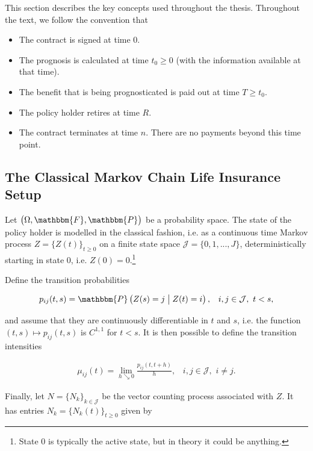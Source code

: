 \documentclass{article}
\newcommand{\1}[1]{\mathbbm{1}_{\left\lbrace #1 \right\rbrace}}
\theoremstyle{break}
\theoremstyle{remark}
\numberwithin{equation}{section}
\begin{document}
This section describes the key concepts used throughout the thesis. Throughout the text, we follow the convention that 

\begin{itemize}
	\item The contract is signed at time $0$.
	\item The prognosis is calculated at time $t_0 \geq 0$ (with the information available at that time).
	\item The benefit that is being prognosticated is paid out at time $T \geq t_0$.
	\item The policy holder retires at time $R$.
	\item The contract terminates at time $n$. There are no payments beyond this time point.
\end{itemize}

\subsection{The Classical Markov Chain Life Insurance Setup}

Let $\left( \Omega, \mathbbm{F}, \mathbbm{P} \right)$ be a probability space. The state of the policy holder is modelled in the classical fashion, i.e. as a continuous time Markov process $Z = \{ Z(t) \}_{t \geq 0}$ on a finite state space $\mathcal{J}= \{ 0, 1, ..., J \} $, deterministically starting in state $0$, i.e. $Z(0) = 0$.\footnote{State 0 is typically the active state, but in theory it could be anything.}

Define the transition probabilities

\begin{align*}
    p_{ij}(t,s) =  \mathbbm{P} \left( Z(s)=j \;\middle\vert\; Z(t)=i \right), \, \, \, \, \, i,j \in \mathcal{J}, \, \, t < s,
\end{align*}

and assume that they are continuously differentiable in $t$ and $s$, i.e. the function $(t,s) \mapsto p_{ij}(t,s)$ is $C^{1,1}$ for $t < s$. It is then possible to define the transition intensities

\begin{align*}
    \mu_{ij}(t) = \lim_{h \searrow 0} \frac{p_{ij} \left( t,t+h \right)}{h}, \, \, \, \, \, i,j \in \mathcal{J}, \, \, i \neq j.
\end{align*}

Finally, let $N = \{ N_{k} \}_{k \in \mathcal{J}}$ be the vector counting process associated with $Z$. It has entries $N_{k} = \{ N_{k}(t) \}_{t \geq 0}$ given by
\end{document}
